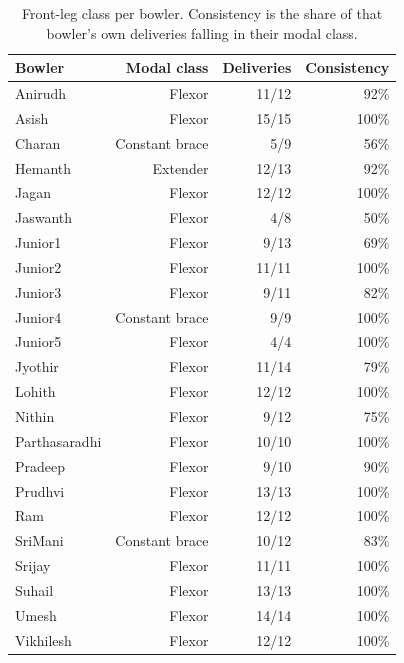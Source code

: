 \begin{table}[htbp]
  \centering
  \caption{Front-leg class per bowler. Consistency is the share of that bowler's own deliveries falling in their modal class.}
  \label{tab:techniqueperbowler}
  \begin{tabular}{lrrr}
    \toprule
    Bowler & Modal class & Deliveries & Consistency \\
    \midrule
    Anirudh & Flexor & 11/12 & 92\% \\
    Asish & Flexor & 15/15 & 100\% \\
    Charan & Constant brace & 5/9 & 56\% \\
    Hemanth & Extender & 12/13 & 92\% \\
    Jagan & Flexor & 12/12 & 100\% \\
    Jaswanth & Flexor & 4/8 & 50\% \\
    Junior1 & Flexor & 9/13 & 69\% \\
    Junior2 & Flexor & 11/11 & 100\% \\
    Junior3 & Flexor & 9/11 & 82\% \\
    Junior4 & Constant brace & 9/9 & 100\% \\
    Junior5 & Flexor & 4/4 & 100\% \\
    Jyothir & Flexor & 11/14 & 79\% \\
    Lohith & Flexor & 12/12 & 100\% \\
    Nithin & Flexor & 9/12 & 75\% \\
    Parthasaradhi & Flexor & 10/10 & 100\% \\
    Pradeep & Flexor & 9/10 & 90\% \\
    Prudhvi & Flexor & 13/13 & 100\% \\
    Ram & Flexor & 12/12 & 100\% \\
    SriMani & Constant brace & 10/12 & 83\% \\
    Srijay & Flexor & 11/11 & 100\% \\
    Suhail & Flexor & 13/13 & 100\% \\
    Umesh & Flexor & 14/14 & 100\% \\
    Vikhilesh & Flexor & 12/12 & 100\% \\
    \bottomrule
  \end{tabular}
\end{table}
